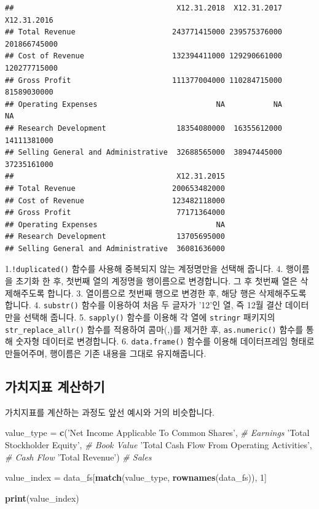\documentclass[]{book}
\newenvironment{Shaded}{\begin{snugshade}}{\end{snugshade}}
\newcommand{\CommentTok}[1]{\textcolor[rgb]{0.56,0.35,0.01}{\textit{#1}}}
\newcommand{\DecValTok}[1]{\textcolor[rgb]{0.00,0.00,0.81}{#1}}
\newcommand{\KeywordTok}[1]{\textcolor[rgb]{0.13,0.29,0.53}{\textbf{#1}}}
\newcommand{\NormalTok}[1]{#1}
\newcommand{\StringTok}[1]{\textcolor[rgb]{0.31,0.60,0.02}{#1}}
\begin{document}
\begin{verbatim}
##                                     X12.31.2018  X12.31.2017  X12.31.2016
## Total Revenue                      243771415000 239575376000 201866745000
## Cost of Revenue                    132394411000 129290661000 120277715000
## Gross Profit                       111377004000 110284715000  81589030000
## Operating Expenses                           NA           NA           NA
## Research Development                18354080000  16355612000  14111381000
## Selling General and Administrative  32688565000  38947445000  37235161000
##                                     X12.31.2015
## Total Revenue                      200653482000
## Cost of Revenue                    123482118000
## Gross Profit                        77171364000
## Operating Expenses                           NA
## Research Development                13705695000
## Selling General and Administrative  36081636000
\end{verbatim}

1.\texttt{!duplicated()} 함수를 사용해 중복되지 않는 계정명만을 선택해 줍니다.
4. 행이름을 초기화 한 후, 첫번째 열의 계정명을 행이름으로 변경합니다. 그 후 첫번째 열은 삭제해주도록 합니다.
3. 열이름으로 첫번째 행으로 변경한 후, 해당 행은 삭제해주도록 합니다.
4. \texttt{substr()} 함수를 이용하여 처음 두 글자가 '12'인 열, 즉 12월 결산 데이터만을 선택해 줍니다.
5. \texttt{sapply()} 함수를 이용해 각 열에 \texttt{stringr} 패키지의 \texttt{str\_replace\_allr()} 함수를 적용하여 콤마(,)를 제거한 후, \texttt{as.numeric()} 함수를 통해 숫자형 데이터로 변경합니다.
6. \texttt{data.frame()} 함수를 이용해 데이터프레임 형태로 만들어주며, 행이름은 기존 내용을 그대로 유지해줍니다.

\hypertarget{section-32}{%
\subsection{가치지표 계산하기}\label{section-32}}

가치지표를 계산하는 과정도 앞선 예시와 거의 비슷합니다.

\begin{Shaded}
\begin{Highlighting}[]
\NormalTok{value_type =}
\StringTok{  }\KeywordTok{c}\NormalTok{(}\StringTok{'Net Income Applicable To Common Shares'}\NormalTok{, }\CommentTok{# Earnings}
    \StringTok{'Total Stockholder Equity'}\NormalTok{, }\CommentTok{# Book Value}
    \StringTok{'Total Cash Flow From Operating Activities'}\NormalTok{, }\CommentTok{# Cash Flow}
    \StringTok{'Total Revenue'}\NormalTok{) }\CommentTok{# Sales}

\NormalTok{value_index =}\StringTok{ }\NormalTok{data_fs[}\KeywordTok{match}\NormalTok{(value_type, }\KeywordTok{rownames}\NormalTok{(data_fs)), }\DecValTok{1}\NormalTok{]}

\KeywordTok{print}\NormalTok{(value_index)}
\end{Highlighting}
\end{Shaded}
\end{document}

